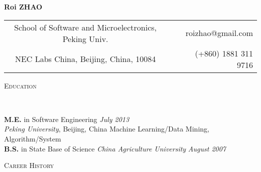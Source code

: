 \documentclass[10pt,a4paper]{article}
\newenvironment{changemargin}[2]{%
  \begin{list}{}{%
    \setlength{\topsep}{0pt}%
    \setlength{\leftmargin}{#1}%
    \setlength{\rightmargin}{#2}%
    \setlength{\listparindent}{\parindent}%
    \setlength{\itemindent}{\parindent}%
    \setlength{\parsep}{\parskip}%
  }%
  \item[]}{\end{list}
}
\newcommand{\lineover}{
	\begin{changemargin}{-0.05in}{-0.05in}
		\vspace*{-8pt}
		\hrulefill \\
		\vspace*{-2pt}
	\end{changemargin}
}
\newcommand{\header}[1]{
	\begin{changemargin}{-0.5in}{-0.5in}
		\scshape{#1}\\
  	\lineover
	\end{changemargin}
}
\newenvironment{body} {
	\vspace*{-16pt}
	\begin{changemargin}{-0.25in}{-0.5in}
  }	
	{\end{changemargin}
}
\begin{document}
\hfill{\Large\textbf{Roi ZHAO}} \\
\begin{flushright}
\begin{tabular}[50em]{ c c r }
{School of Software and Microelectronics, Peking Univ.}& \qquad &{roizhao@gmail.com} \\
{NEC Labs China, Beijing, China, 10084}& \qquad &{(+860) 1881 311 9716} \\
\end{tabular}
\end{flushright}

%
%


\header{Education}

\begin{body}
	\vspace{14pt}
	\textbf{M.E.} in Software Engineering{} \hfill \emph{July 2013}{} \\
	\emph{Peking University}, Beijing, China{} \hfill Machine Learning/Data Mining, Algorithm/System \\
  \medskip
	\textbf{B.S.} in State Base of Science \qquad \emph{China Agriculture University} \hfill \emph{August 2007} \\
\end{body}

\smallskip


\header{Career History}
\end{document}
